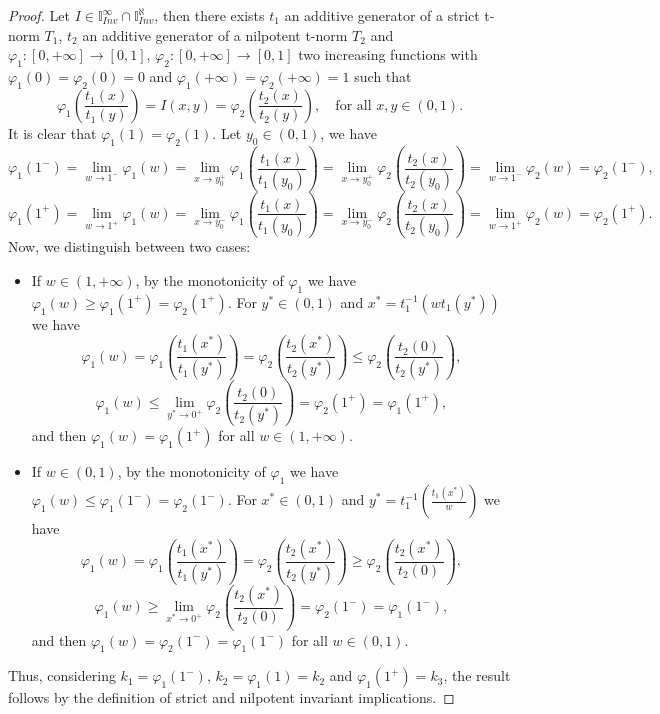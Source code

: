 \begin{proof}
	Let $I \in  \mathbb{I}^{\infty}_{Inv} \cap \mathbb{I}^{\aleph}_{Inv}$, then there exists $t_1$ an additive generator of a strict t-norm $T_1$, $t_2$ an additive generator of a nilpotent t-norm $T_2$ and $\varphi_1: [0,+\infty] \to [0,1]$, $\varphi_2: [0,+\infty] \to [0,1]$ two increasing functions with $\varphi_1(0)=\varphi_2(0)=0$ and $\varphi_1(+\infty)=\varphi_2(+\infty)=1$ such that
	$$\varphi_1 \left(\frac{t_1(x)}{t_1(y)}\right) = I(x,y) = \varphi_2 \left(\frac{t_2(x)}{t_2(y)}\right), \quad \text{for all } x,y \in (0,1).$$
	It is clear that $\varphi_1(1)=\varphi_2(1)$. Let $y_0 \in (0,1)$, we have
	$$\varphi_1(1^-)=\lim_{w \to 1^{-}} \varphi_1(w)=\lim_{x \to y_0^+} \varphi_1 \left(\frac{t_1(x)}{t_1(y_0)}\right)=\lim_{x \to y_0^+} \varphi_2 \left(\frac{t_2(x)}{t_2(y_0)}\right) = \lim_{w \to 1^{-}} \varphi_2(w)=\varphi_2(1^-),$$
	$$\varphi_1(1^+)=\lim_{w \to 1^{+}} \varphi_1(w)= \lim_{x \to y_0^-} \varphi_1 \left(\frac{t_1(x)}{t_1(y_0)}\right)=\lim_{x \to y_0^-} \varphi_2 \left(\frac{t_2(x)}{t_2(y_0)}\right) =\lim_{w \to 1^{+}} \varphi_2(w)= \varphi_2(1^+).$$
	Now, we distinguish between two cases:
	\begin{itemize}
		\item If $w \in (1,+\infty)$, by the monotonicity of $\varphi_1$ we have $\varphi_1(w) \geq \varphi_1(1^+) = \varphi_2(1^+)$. For $y^* \in (0,1)$ and $x^* = t_1^{-1}(wt_1(y^*))$ we have
		$$\varphi_1(w)=\varphi_1 \left(\frac{t_1(x^*)}{t_1(y^*)}\right)=\varphi_2 \left(\frac{t_2(x^*)}{t_2(y^*)}\right) \leq \varphi_2 \left(\frac{t_2(0)}{t_2(y^*)}\right),$$
		$$\varphi_1(w) \leq \lim_{y^* \to 0^+} \varphi_2 \left(\frac{t_2(0)}{t_2(y^*)}\right) = \varphi_2(1^+)=\varphi_1(1^+), $$
		and then $\varphi_1(w) = \varphi_1(1^+)$ for all $w \in (1,+\infty)$.
		\item If $w \in (0,1)$, by the monotonicity of $\varphi_1$ we have $\varphi_1(w) \leq \varphi_1(1^-) = \varphi_2(1^-)$. For $x^* \in (0,1)$  and $y^*=t_1^{-1}\left(\frac{t_1(x^*)}{w}\right)$ we have
		$$\varphi_1(w) = \varphi_1 \left(\frac{t_1(x^*)}{t_1(y^*)}\right)= \varphi_2 \left(\frac{t_2(x^*)}{t_2(y^*)}\right) \geq \varphi_2 \left(\frac{t_2(x^*)}{t_2(0)}\right),$$
		$$\varphi_1(w) \geq \lim_{x^* \to 0^+} \varphi_2 \left(\frac{t_2(x^*)}{t_2(0)}\right) = \varphi_2(1^-)=\varphi_1(1^-),$$
		and then $\varphi_1(w)= \varphi_2(1^-) = \varphi_1(1^-)$ for all $w \in (0,1)$.
	\end{itemize}
	Thus, considering $k_1= \varphi_1(1^-)$, $k_2 = \varphi_1(1)=k_2$ and $\varphi_1(1^+)=k_3$, the result follows  by the definition of strict and nilpotent invariant implications.
\end{proof}

